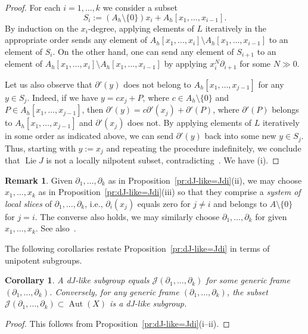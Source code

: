 \documentclass[12pt,a4paper]{amsart}
\theoremstyle{plain}
\newtheorem{corollary}[theorem]{Corollary}
\theoremstyle{definition}
\newtheorem{remark}[theorem]{Remark}
\theoremstyle{remark}
\def\Aut{\operatorname{Aut}}
\def\Lie{\operatorname{Lie}}
\def\J{{\mathcal J}}
\begin{document}
\begin{proof}
   For each $i=1,\ldots,k$ we consider a subset 
   \begin{equation}\label{eq:Si}
      S_i := (A_h\setminus\{0\})x_i + A_h[x_1,\ldots,x_{i-1}].
   \end{equation}
   By induction on the $x_i$-degree, applying elements of $L$ iteratively in the appropriate order sends any element of $A_h[x_1,\ldots,x_{i}]\setminus A_h[x_1,\ldots,x_{i-1}]$ to an element of $S_i$.
    On the other hand, one can send any element of $S_{i+1}$ to an element of $A_h[x_1,\ldots,x_{i}]\setminus A_h[x_1,\ldots,x_{i-1}]$ by applying $x_{i}^N\partial_{i+1}$ for some $N\gg0$.

    Let us also observe that $\partial'(y)$ does not belong to $A_h[x_1,\ldots,x_{j-1}]$ for any $y\in S_j$.
    Indeed, if we have $y=c x_j+P$, where $c\in A_h\setminus\{0\}$ and $P\in A_h[x_1,\ldots,x_{j-1}]$, then $\partial'(y)=c\partial'(x_j) + \partial'(P)$, where  $\partial'(P)$ belongs to $A_h[x_1,\ldots,x_{j-1}]$ and $\partial'(x_j)$ does not.
   By applying elements of $L$ iteratively in some order as indicated above, we can send $\partial'(y)$ back into some new $y\in S_j$.
   Thus, starting with $y:=x_j$ and repeating the procedure indefinitely, we
   conclude that $\Lie J$ is not a locally nilpotent subset, contradicting~\cite[Proposition]{Skutin}.
   We have (i).
\end{proof}


\begin{remark}\label{rm:local-slice-system}
   Given $\partial_1,\ldots,\partial_k$ as in Proposition~\ref{pr:dJ-like=Jdi}(ii), we may choose $x_1,\ldots,x_k$ as in Proposition~\ref{pr:dJ-like=Jdi}(iii) so that they comprise a \emph{system of local slices} of $\partial_1,\ldots,\partial_k$, i.e., $\partial_i(x_j)$ equals zero for $j\neq i$ and belongs to $A\setminus\{0\}$ for $j=i$. 
   The converse also holds, we may similarly choose $\partial_1,\ldots,\partial_k$ for given $x_1,\ldots,x_k$.
   See also~\cite[Proposition 3.27]{Freudenburg}.
\end{remark}


The following corollaries restate Proposition~\ref{pr:dJ-like=Jdi} in terms of unipotent subgroups.

\begin{corollary}\label{cor:dJ-like=Jdi}
   A dJ-like subgroup equals $\J(\partial_1,\ldots,\partial_k)$ for some generic frame $(\partial_1,\ldots,\partial_k)$. 
   Conversely, for any generic frame $(\partial_1,\ldots,\partial_k)$, the subset $\J(\partial_1,\ldots,\partial_k)\subset\Aut(X)$ is a dJ-like subgroup.
\end{corollary}
\begin{proof}
   This follows from Proposition~\ref{pr:dJ-like=Jdi}(i--ii).
\end{proof}
\end{document}
